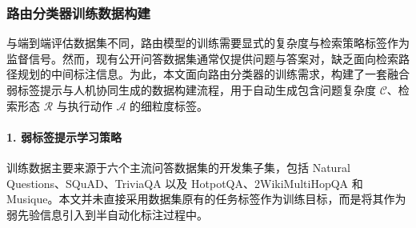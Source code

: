 \begin{table}[htbp]
    \centering
    \caption{端到端评估所采用的基准数据集统计与特征}
    \label{tab:datasets}
    \renewcommand{\arraystretch}{1.2}
\end{table}


\subsubsection{路由分类器训练数据构建}

与端到端评估数据集不同，路由模型的训练需要显式的复杂度与检索策略标签作为监督信号。然而，现有公开问答数据集通常仅提供问题与答案对，缺乏面向检索路径规划的中间标注信息。为此，本文面向路由分类器的训练需求，构建了一套融合弱标签提示与人机协同生成的数据构建流程，用于自动生成包含问题复杂度 $\mathcal{C}$、检索形态 $\mathcal{R}$ 与执行动作 $\mathcal{A}$ 的细粒度标签。

\paragraph{1. 弱标签提示学习策略}

训练数据主要来源于六个主流问答数据集的开发集子集，包括 Natural Questions、SQuAD、TriviaQA 以及 HotpotQA、2WikiMultiHopQA 和 Musique。本文并未直接采用数据集原有的任务标签作为训练目标，而是将其作为弱先验信息引入到半自动化标注过程中。

